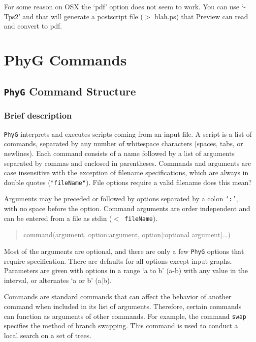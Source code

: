 \documentclass[11pt]{book}
\newcommand{\phyg}{\texttt{PhyG} }
\begin{document}
{{	For some reason on OSX the `pdf' option does not seem to work. You can use `-Tps2' and that will generate 
	a postscript file ($>$ blah.ps) that Preview can read and convert to pdf.

	

	
\chapter{PhyG Commands}

\section{\phyg Command Structure}
		
	\subsection{Brief description}
		\phyg interprets and executes scripts coming from an input file. A script is a list of 
		commands, separated by any number of whitespace characters (spaces, tabs, or 
		newlines). Each command consists of a name followed by a list of arguments 
		separated by commas and enclosed in parentheses. Commands and arguments 
		are case insensitive with the exception of filename specifications, which are always 
		in double quotes (\texttt{"fileName"}). File options require a valid filename %
		does this mean?} 
		Arguments may be preceded or followed by 
		options separated by a colon \texttt{`:'}, with no space before the option. Command 
		arguments are order independent and can be entered from a file as stdin 
		(\texttt{$<$ fileName}).
		
		\begin{quote}
		command(argument, option:argument, option[:optional argument]...)
		\end{quote}
	
		\noindent Most of the arguments are optional, and there are only a few \phyg options
		 that require specification. 	There are defaults for all options except input graphs. 
		 Parameters are given with options in a range `a to b' (a-b) with any value in the interval, 
		 or alternates `a or b' (a|b). 
		
		Commands are standard commands that can affect the behavior of another command 
		when included in its list of arguments. Therefore, certain commands can function as 
		arguments of other commands. For example, the command \texttt{swap} specifies 
		the method of branch swapping. This command is used to conduct a local search on 
		a set of trees. %

}
\end{document}

